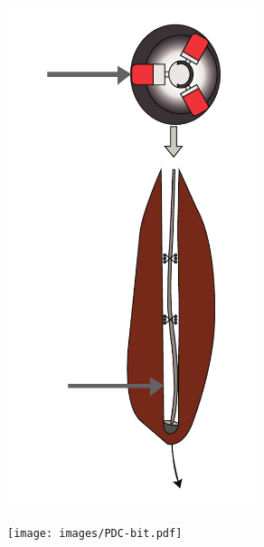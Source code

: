 \documentclass[10pt]{beamer}
\begin{document}
\begin{frame}
\begin{columns}
\begin{column}{0.4\textwidth}
\begin{figure}[ht]
\begin{minipage}[t]{1\textwidth}
				\hspace{0cm}	\includegraphics[width=0.65\textwidth]{images/RSS.pdf}
				\end{minipage}
				\begin{minipage}[b]{1\textwidth}
			\hspace{1cm} \texttt{[image: images/PDC-bit.pdf]}
			\end{minipage}
			\end{figure}			
		\end{column}
	\end{columns}
\end{frame}
\end{document}
